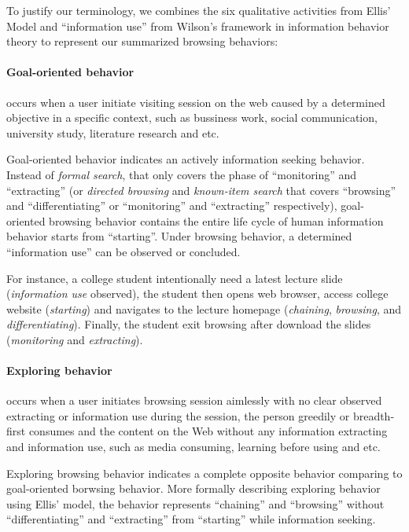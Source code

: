 To justify our terminology, we combines the six qualitative activities from Ellis' Model 
\cite{ellis1989behavioural} and ``information use'' from Wilson's framework \cite{wilson1997information} in information behavior theory 
to represent our summarized browsing behaviors:

\paragraph{Goal-oriented behavior} occurs when a user initiate 
visiting session on the web caused by a determined objective in a specific context, 
such as bussiness work, 
social communication, university study, literature research and etc. 

Goal-oriented behavior indicates an actively information seeking behavior.
Instead of \emph{formal search}, that only covers the phase of ``monitoring'' and ``extracting''
(or \emph{directed browsing} and \emph{known-item search} that covers ``browsing'' and ``differentiating'' or 
``monitoring'' and ``extracting'' respectively), 
goal-oriented browsing behavior contains the entire life cycle of human information behavior starts
from ``starting''. Under browsing behavior, a determined ``information use'' can be observed
or concluded.

For instance, a college student intentionally need a latest lecture slide (\emph{information use} observed), 
the student then opens web browser, access college website (\emph{starting}) and navigates to the lecture homepage 
(\emph{chaining}, \emph{browsing}, and \emph{differentiating}).
Finally, the student exit browsing after download the slides (\emph{monitoring} and \emph{extracting}).

\paragraph{Exploring behavior} occurs when a user initiates browsing session aimlessly with no clear observed
extracting or information use during the session, the person greedily or breadth-first consumes and the content on the Web without 
any information extracting and information use, such as media consuming, learning before using and etc.

Exploring browsing behavior indicates a complete opposite behavior comparing to 
goal-oriented borwsing behavior. More formally describing exploring behavior using Ellis' model, 
the behavior represents ``chaining'' and ``browsing''
without ``differentiating'' and ``extracting'' from ``starting'' while information seeking.

